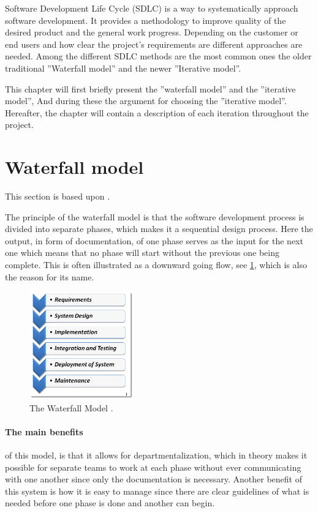 Software Development Life Cycle (SDLC) is a way to systematically approach software development.
It provides a methodology to improve quality of the desired product and the general work progress. 
Depending on the customer or end users and how clear the project's requirements are different approaches are needed. 
Among the different SDLC methods are the most common ones the older traditional ''Waterfall model'' and the newer ''Iterative model''. \cite{SDLC-Toolsqa}


This chapter will first briefly present the ''waterfall model'' and the ''iterative model'', And during these the argument for choosing the ''iterative model''.
Hereafter, the chapter will contain a description of each iteration throughout the project.


\section{Waterfall model}
This section is based upon \cite{Waterfall-Toolsqa}.

The principle of the waterfall model is that the software development process is divided into separate phases, which makes it a sequential design process.
Here the output, in form of documentation, of one phase serves as the input for the next one which means that no phase will start without the previous one being complete.
This is often illustrated as a downward going flow, see \cref{fig:Waterfall}, which is also the reason for its name.

\begin{figure}[H]
	\centering
	\includegraphics[width=0.4\textwidth]{billeder/WaterFall-Model.png}
	\caption{The Waterfall Model \cite{Waterfall-Toolsqa}.}\label{fig:Waterfall}
\end{figure}

\paragraph{The main benefits} of this model, is that it allows for departmentalization, which in theory makes it possible for separate teams to work at each phase without ever communicating with one another since only the documentation is necessary.
Another benefit of this system is how it is easy to manage since there are clear guidelines of what is needed before one phase is done and another can begin.

